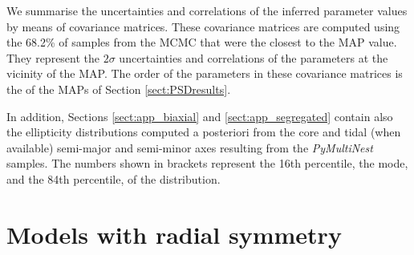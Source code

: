 We summarise the uncertainties and correlations of the inferred parameter values by means of covariance matrices. These covariance matrices
are computed using the 68.2\% of samples from the MCMC that were the closest to the MAP value. They represent the $2\sigma$ uncertainties
and correlations of the parameters at the vicinity of the MAP. The order of the parameters in these covariance matrices is the of the MAPs of Section  \ref{sect:PSDresults}.

In addition, Sections \ref{sect:app_biaxial} and \ref{sect:app_segregated} contain also the ellipticity distributions computed a posteriori from the core and tidal (when available) semi-major and semi-minor axes resulting from the \emph{PyMultiNest} samples. The numbers shown in brackets represent the 16th percentile, the mode, and the 84th percentile, of the distribution. 

 \section{Models with radial symmetry}
 \label{sect:app_radial}
 

